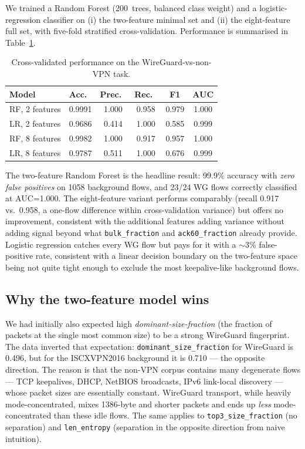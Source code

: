 \documentclass[conference]{IEEEtran}
\begin{document}
We trained a Random Forest (200~trees, balanced class weight) and a
logistic-regression classifier on (i) the two-feature minimal set and
(ii) the eight-feature full set, with five-fold stratified
cross-validation. Performance is summarised in Table~\ref{tab:perf}.

\begin{table}[t]
\centering
\caption{Cross-validated performance on the WireGuard-vs-non-VPN task.}
\label{tab:perf}
\begin{tabular}{@{}lccccc@{}}
\toprule
Model & Acc.\ & Prec.\ & Rec.\ & F1 & AUC \\
\midrule
RF, 2 features  & 0.9991 & 1.000 & 0.958 & 0.979 & 1.000 \\
LR, 2 features  & 0.9686 & 0.414 & 1.000 & 0.585 & 0.999 \\
RF, 8 features  & 0.9982 & 1.000 & 0.917 & 0.957 & 1.000 \\
LR, 8 features  & 0.9787 & 0.511 & 1.000 & 0.676 & 0.999 \\
\bottomrule
\end{tabular}
\end{table}

The two-feature Random Forest is the headline result: 99.9\% accuracy with
\emph{zero false positives} on 1058 background flows, and 23/24 WG flows
correctly classified at AUC=1.000. The eight-feature variant performs
comparably (recall 0.917 vs.\ 0.958, a one-flow difference within
cross-validation variance) but offers no improvement, consistent with
the additional features adding variance without adding signal beyond
what \texttt{bulk\_fraction} and \texttt{ack60\_fraction} already
provide. Logistic regression catches every WG flow but pays for it
with a $\sim$3\% false-positive rate, consistent with a linear
decision boundary on the two-feature space being not quite tight
enough to exclude the most keepalive-like background flows.

\subsection{Why the two-feature model wins}

We had initially also expected high \emph{dominant-size-fraction} (the
fraction of packets at the single most common size) to be a strong
WireGuard fingerprint. The data inverted that expectation:
\texttt{dominant\_size\_fraction} for WireGuard is 0.496, but for the
ISCXVPN2016 background it is 0.710 --- the opposite direction. The reason
is that the non-VPN corpus contains many degenerate flows --- TCP
keepalives, DHCP, NetBIOS broadcasts, IPv6 link-local discovery --- whose
packet sizes are essentially constant. WireGuard transport, while heavily
mode-concentrated, mixes 1386-byte and shorter packets and ends up
\emph{less} mode-concentrated than these idle flows. The same applies to
\texttt{top3\_size\_fraction} (no separation) and \texttt{len\_entropy}
(separation in the opposite direction from naive intuition).
\end{document}
